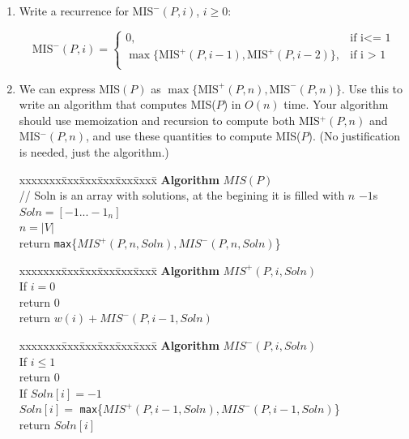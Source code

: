 \documentclass[11pt]{article}
\def\question#1{\red{#1}}
\def\soln#1{\par\blu{#1}} %
\def\blu#1{{\color{blu}#1}}
\def\red#1{{\color{red}#1}}
\begin{document}
\begin{enumerate}
\item \question{Write a recurrence for $\mbox{MIS}^-(P,i)$, $i\ge 0$:}
\soln{
\[
   \mbox{MIS}^-(P,i) = \left \{\begin{array}{ll}
                   0, & \mbox{if i<= 1} \\[.3in]
                   \max \{ \mbox{MIS}^+(P,i-1) , \mbox{MIS}^+(P,i-2) \}, & \mbox{if i > 1} \\
                   \end{array} \right.
   \]
   }
\item 
We can express MIS$(P)$ as $\max \{\mbox{MIS}^+(P,n), \mbox{MIS}^-(P,n) \}$. 
\question{Use this to write an algorithm that computes MIS($P$) in $O(n)$ time.}  
Your algorithm should use memoization and recursion to compute both
MIS$^+(P,n)$ and MIS$^-(P,n)$, and use these quantities to compute
MIS($P$). (No justification is needed, just the algorithm.)
\soln{
  \begin{tabbing}
  xxxxxxx\=xxx\=xxx\=xxx\=xxx\=xxxx\= \kill
  \> {\bf Algorithm} $MIS(P)$ \\
  \>\> // Soln is an array with solutions, at the begining it is filled with $n$ $-1$s \\
  \>\> $Soln = [-1...-1_n]$ \\
  \>\> $n = |V|$ \\
  \>\> return \texttt{max}\{$MIS^+(P,n,Soln),MIS^-(P,n,Soln)$\} \\
  \end{tabbing}
  \begin{tabbing}
  xxxxxxx\=xxx\=xxx\=xxx\=xxx\=xxxx\= \kill
  \> {\bf Algorithm} $MIS^+(P,i,Soln)$ \\
  \>\> If $i = 0$ \\
  \>\>\> return $0$ \\
  \>\> return $w(i) + MIS^-(P,i-1,Soln)$ \\
  \end{tabbing}
  \begin{tabbing}
  xxxxxxx\=xxx\=xxx\=xxx\=xxx\=xxxx\= \kill
  \> {\bf Algorithm} $MIS^-(P,i,Soln)$ \\
  \>\> If $i \leq 1$ \\
  \>\>\> return $0$ \\
  \>\> If $Soln[i] = -1$ \\
  \>\>\> $Soln[i] = $ \texttt{max}\{$MIS^+(P,i-1,Soln),MIS^-(P,i-1,Soln)$\} \\
  \>\> return $Soln[i]$ \\
  \end{tabbing}
}


\end{enumerate}
\end{document}
